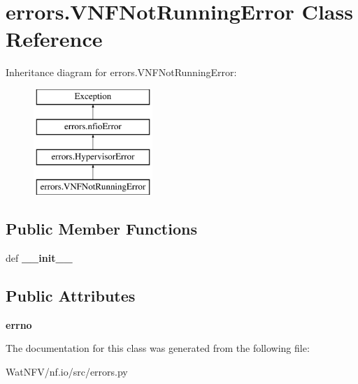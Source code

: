 \hypertarget{classerrors_1_1VNFNotRunningError}{\section{errors.\-V\-N\-F\-Not\-Running\-Error Class Reference}
\label{classerrors_1_1VNFNotRunningError}
}
Inheritance diagram for errors.\-V\-N\-F\-Not\-Running\-Error\-:\begin{figure}[H]
\begin{center}
\leavevmode
\includegraphics[height=4.000000cm]{classerrors_1_1VNFNotRunningError}
\end{center}
\end{figure}
\subsection*{Public Member Functions}
\begin{DoxyCompactItemize}
\item 
\hypertarget{classerrors_1_1VNFNotRunningError_a9f548d7d752d002aad923fa0d39a9e12}{def {\bfseries \-\_\-\-\_\-init\-\_\-\-\_\-}}\label{classerrors_1_1VNFNotRunningError_a9f548d7d752d002aad923fa0d39a9e12}

\end{DoxyCompactItemize}
\subsection*{Public Attributes}
\begin{DoxyCompactItemize}
\item 
\hypertarget{classerrors_1_1VNFNotRunningError_a0851579bdfdaf110fa92e6d2df503827}{{\bfseries errno}}\label{classerrors_1_1VNFNotRunningError_a0851579bdfdaf110fa92e6d2df503827}

\end{DoxyCompactItemize}


The documentation for this class was generated from the following file\-:\begin{DoxyCompactItemize}
\item 
Wat\-N\-F\-V/nf.\-io/src/errors.\-py\end{DoxyCompactItemize}
